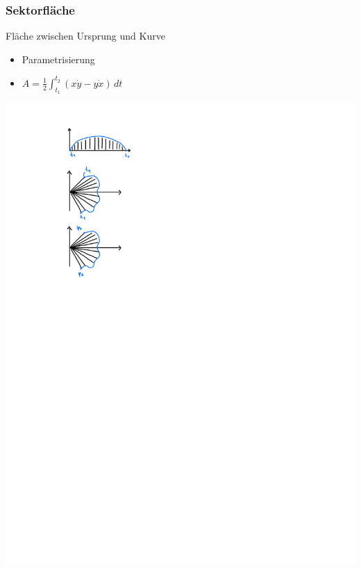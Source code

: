     \subsubsection{Sektorfläche}
        \flushleft Fläche zwischen Ursprung und Kurve
        \begin{minipage}{0.99\linewidth}
            \begin{minipage}{0.65\linewidth}
                \begin{itemize}
                    \item Parametrisierung
                    \item[]  $\displaystyle A= \frac{1}{2} \int_{t_1}^{t_2} (x \dot{y} - y \dot{x}) \, dt$   
                    \end{itemize}
            \end{minipage}
            \begin{minipage}{0.34\linewidth}
                    \includegraphics[width=0.6\linewidth]{src/Integralrechnung/sektor.pdf}
            \end{minipage}
        \end{minipage}
        
